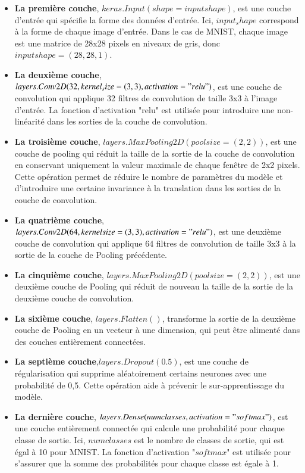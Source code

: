 \begin{itemize}
    \item \textbf{La première couche}, $keras.Input(shape=inputshape)$, est une couche d'entrée qui spécifie la forme des données d'entrée. Ici, $input_shape$ correspond à la forme de chaque image d'entrée. Dans le cas de MNIST, chaque image est une matrice de 28x28 pixels en niveaux de gris, donc $inputshape=(28, 28, 1)$.
    \vspace{0.5cm}
    \item \textbf{La deuxième couche}, $layers.Conv2D(32, kernel_size=(3, 3), activation="relu")$, est une couche de convolution qui applique 32 filtres de convolution de taille 3x3 à l'image d'entrée. La fonction d'activation "relu" est utilisée pour introduire une non-linéarité dans les sorties de la couche de convolution.
        \vspace{0.5cm}
    \item \textbf{La troisième couche}, $layers.MaxPooling2D(poolsize=(2, 2))$, est une couche de pooling qui réduit la taille de la sortie de la couche de convolution en conservant uniquement la valeur maximale de chaque fenêtre de 2x2 pixels. Cette opération permet de réduire le nombre de paramètres du modèle et d'introduire une certaine invariance à la translation dans les sorties de la couche de convolution.
        \vspace{0.5cm}
    \item \textbf{La quatrième couche}, $layers.Conv2D(64, kernelsize=(3, 3), activation="relu")$, est une deuxième couche de convolution qui applique 64 filtres de convolution de taille 3x3 à la sortie de la couche de Pooling précédente.
            \vspace{0.5cm}

     \item \textbf{La cinquième  couche}, $layers.MaxPooling2D(poolsize=(2, 2))$, est une deuxième couche de Pooling qui réduit de nouveau la taille de la sortie de la deuxième couche de convolution.
         \vspace{0.5cm}
    \item \textbf{La sixième   couche}, $layers.Flatten()$, transforme la sortie de la deuxième couche de Pooling en un vecteur à une dimension, qui peut être alimenté dans des couches entièrement connectées.
        \vspace{0.5cm}
    \item \textbf{La septième couche},$layers.Dropout(0.5)$, est une couche de régularisation qui supprime aléatoirement certains neurones avec une probabilité de 0,5. Cette opération aide à prévenir le sur-apprentissage du modèle.
        \vspace{0.5cm}
     \item \textbf{La dernière   couche}, $layers.Dense(numclasses, activation="softmax")$, est une couche entièrement connectée qui calcule une probabilité pour chaque classe de sortie. Ici, $numclasses$ est le nombre de classes de sortie, qui est égal à 10 pour MNIST. La fonction d'activation "$softmax$" est utilisée pour s'assurer que la somme des probabilités pour chaque classe est égale à 1. 
\end{itemize}
